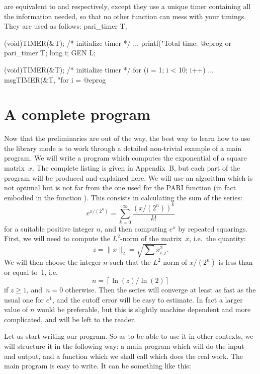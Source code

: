 

\noindent are equivalent to  and  respectively,
except they use a unique timer  containing all the information needed,
so that no other function can mess with your timings. They are used as
follows:
\bprog
  pari_timer T;

  (void)TIMER(&T); /* initialize timer */
  ...
  printf("Total time: %
@eprog
or
\bprog
  pari_timer T;
  long i;
  GEN L;

  (void)TIMER(&T); /* initialize timer */
  for (i = 1; i < 10; i++) {
    ...
    msgTIMER(&T, "for i = %
  }
@eprog

\section{A complete program}
\label{se:prog}

\noindent
Now that the preliminaries are out of the way, the best way to learn how to
use the library mode is to work through a detailed non-trivial example of a
main program. We will write a program which computes the exponential of a
square matrix~$x$.  The complete listing is given in Appendix~B, but each
part of the program will be produced and explained here. We will use an
algorithm which is not optimal but is not far from the one used for the PARI
function  (in fact embodied in the function ). This
consists in calculating the sum of the series:
$$e^{x/(2^n)}=\sum_{k=0}^\infty \dfrac{(x/(2^n))^k}{k!}$$
for a suitable positive integer $n$, and then computing $e^x$ by repeated
squarings.  First, we will need to compute the $L^2$-norm of the matrix~$x$,
i.e.~the quantity:
$$z=\|x\|_2=\sqrt{\sum x_{i,j}^2}.$$
We will then choose the integer $n$ such that the $L^2$-norm of $x/(2^n)$ is
less than or equal to~1, i.e.
$$ n = \left\lceil{\ln(z)}\big/{\ln(2)}\right\rceil $$
if $z\ge1$, and~$n=0$ otherwise. Then the series will converge at least as
fast as the usual one for $e^1$, and the cutoff error will be easy to
estimate. In fact a larger value of $n$ would be preferable, but this is
slightly machine dependent and more complicated, and will be left to the
reader.

Let us start writing our program. So as to be able to use it in other
contexts, we will structure it in the following way: a main program which
will do the input and output, and a function which we shall call 
which does the real work. The main program is easy to write. It can be
something like this:

